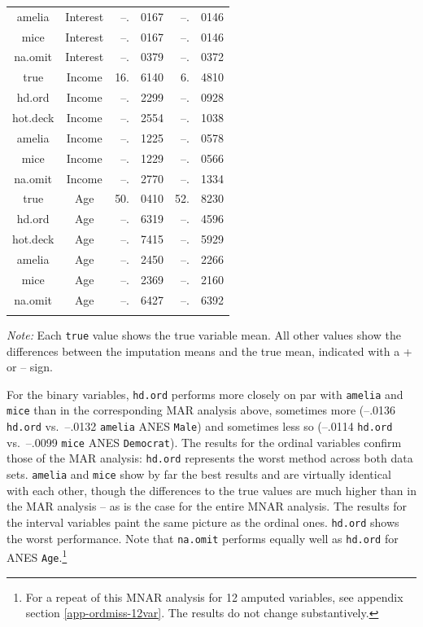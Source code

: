 \documentclass[12pt,econ]{sources/authesis}
\begin{document}
\begin{table}[!htbp]
\begin{threeparttable}
\begin{tabular}{ccr@{}lr@{}l}
 amelia & Interest & --.&0167 & --.&0146 \\
 mice & Interest & --.&0167 & --.&0146 \\
 na.omit & Interest & --.&0379 & --.&0372 \\
 true & Income & 16.&6140 & 6.&4810 \\
 hd.ord & Income & --.&2299 & --.&0928 \\ 
 hot.deck & Income & --.&2554 & --.&1038 \\
 amelia & Income & --.&1225 & --.&0578 \\
 mice & Income & --.&1229 & --.&0566 \\
 na.omit & Income & --.&2770 & --.&1334 \\
 true & Age & 50.&0410 & 52.&8230 \\
 hd.ord & Age & --.&6319 & --.&4596 \\ 
 hot.deck & Age & --.&7415 & --.&5929 \\ 
 amelia & Age & --.&2450 & --.&2266 \\
 mice & Age & --.&2369 & --.&2160 \\ 
 na.omit & Age & --.&6427 & --.&6392 \\
 \hline \\[-1.8ex] 
\end{tabular} 
\begin{tablenotes}
\footnotesize{\textit{Note:} Each \texttt{true} value shows the true variable mean. All other values show the differences between the imputation means and the true mean, indicated with a + or -- sign.}
\end{tablenotes}
\end{threeparttable}
\end{table}
For the binary variables, \texttt{hd.ord} performs more closely on par with \texttt{amelia} and \texttt{mice} than in the corresponding MAR analysis above, sometimes more (--.0136 \texttt{hd.ord} vs.~--.0132 \texttt{amelia} ANES \texttt{Male}) and sometimes less so (--.0114 \texttt{hd.ord} vs.~--.0099 \texttt{mice} ANES \texttt{Democrat}). The results for the ordinal variables confirm those of the MAR analysis: \texttt{hd.ord} represents the worst method across both data sets. \texttt{amelia} and \texttt{mice} show by far the best results and are virtually identical with each other, though the differences to the true values are much higher than in the MAR analysis -- as is the case for the entire MNAR analysis. The results for the interval variables paint the same picture as the ordinal ones. \texttt{hd.ord} shows the worst performance. Note that \texttt{na.omit} performs equally well as \texttt{hd.ord} for ANES \texttt{Age}.\footnote{For a repeat of this MNAR analysis for 12 amputed variables, see appendix section \ref{app-ordmiss-12var}. The results do not change substantively.}
\end{document}
